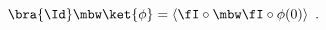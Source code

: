 \begin{equation}
\bra{\Id}\mbw \ket{\phi}=\left<\fI  \circ
\mbw \fI \circ \phi(0)\right> \ .
\end{equation}

